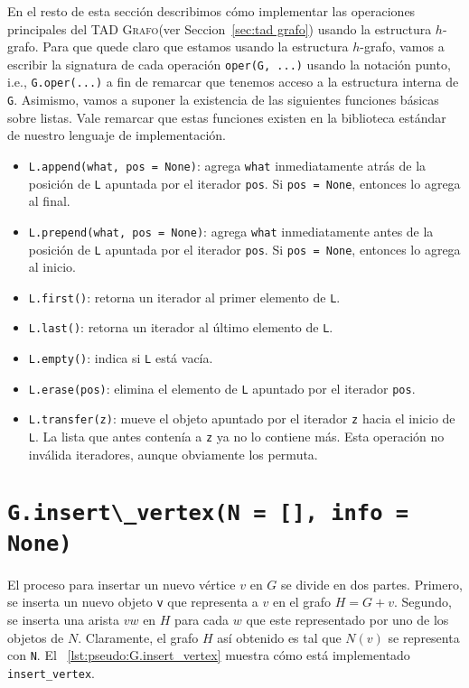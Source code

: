 \documentclass[%
    a4paper,%
    fontsize=12pt,%
    DIV=12,
    twoside,%
    openright,%
    titlepage=true,%
    headsepline,%
    toc=bibliography,%
    parskip=half,%
    cleardoublepage=empty,%
    headings=big,%
]{scrbook}
\makeatletter
\newcommand{\Grafo}{\textsc{Grafo}\xspace}
\newcommand{\Code}[1]{\lstinline[basicstyle={\ttfamily}]@#1@}
\makeatother
\begin{document}
En el resto de esta sección describimos cómo implementar las operaciones principales del TAD \Grafo (ver Seccion~\ref{sec:tad grafo}) usando la estructura $h$-grafo.  Para que quede claro que estamos usando la estructura $h$-grafo, vamos a escribir la signatura de cada operación \Code{oper(G, ...)} usando la notación punto, i.e., \Code{G.oper(...)} a fin de remarcar que tenemos acceso a la estructura interna de \Code{G}.  Asimismo, vamos a suponer la existencia de las siguientes funciones básicas sobre listas.  Vale remarcar que estas funciones existen en la biblioteca estándar de nuestro lenguaje de implementación.
\begin{itemize}
  \item \Code{L.append(what, pos = None)}: agrega \Code{what} inmediatamente atrás de la posición de \Code{L} apuntada por el iterador \Code{pos}.  Si \Code{pos = None}, entonces lo agrega al final.
  \item \Code{L.prepend(what, pos = None)}: agrega \Code{what} inmediatamente antes de la posición de \Code{L} apuntada por el iterador \Code{pos}.  Si \Code{pos = None}, entonces lo agrega al inicio.
  \item \Code{L.first()}: retorna un iterador al primer elemento de \Code{L}.
  \item \Code{L.last()}: retorna un iterador al último elemento de \Code{L}. 
  \item \Code{L.empty()}: indica si \Code{L} está vacía.
  \item \Code{L.erase(pos)}: elimina el elemento de \Code{L} apuntado por el iterador \Code{pos}.
  \item \Code{L.transfer(z)}: mueve el objeto apuntado por el iterador \Code{z} hacia el inicio de \Code{L}.  La lista que antes contenía a \Code{z} ya no lo contiene más.  Esta operación no inválida iteradores, aunque obviamente los permuta.
\end{itemize}

\section{\texorpdfstring{\Code{G.insert\_vertex(N = [], info = None)}}{G.insert\_vertex}}
\label{sec:hgraph:insert_vertex}


El proceso para insertar un nuevo vértice $v$ en $G$ se divide en dos partes.  Primero, se inserta un nuevo objeto \Code{v} que representa a $v$ en el grafo $H = G + v$.  Segundo, se inserta una arista $vw$ en $H$ para cada $w$ que este representado por uno de los objetos de $N$.  Claramente, el grafo $H$ así obtenido es tal que $N(v)$ se representa con \Code{N}.  El \lstlistingname~\ref{lst:pseudo:G.insert_vertex} muestra cómo está implementado \Code{insert_vertex}.
\end{document}
